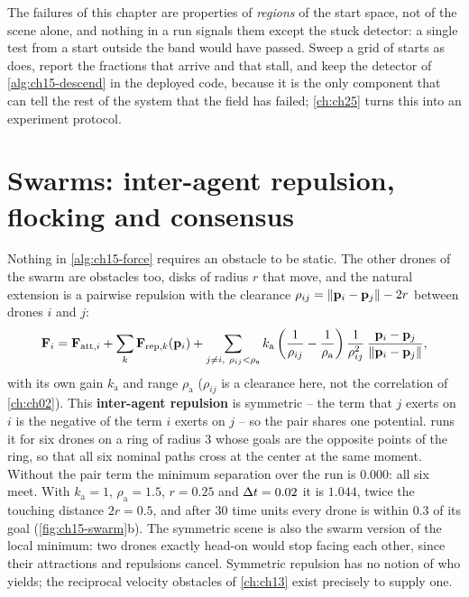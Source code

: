 The failures of this chapter are properties of \emph{regions} of the start
space, not of the scene alone, and nothing in a run signals them except the
stuck detector: a single test from a start outside the band would have
passed. Sweep a grid of starts as  does, report the
fractions that arrive and that stall, and keep the detector of
\cref{alg:ch15-descend} in the deployed code, because it is the only component
that can tell the rest of the system that the field has failed;
\cref{ch:ch25} turns this into an experiment protocol.

\section{Swarms: inter-agent repulsion, flocking and consensus}
\label{sec:ch15-swarm}

Nothing in \cref{alg:ch15-force} requires an obstacle to be static. The
other drones of the swarm are obstacles too, disks of radius $r$ that move,
and the natural extension is a pairwise repulsion with the clearance
$\rho_{ij} = \left\lVert \mathbf{p}_i - \mathbf{p}_j \right\rVert - 2r$ between drones $i$ and $j$:
\begin{equation}
  \mathbf{F}_i = \mathbf{F}_{\mathrm{att},i} + \sum_{k} \mathbf{F}_{\mathrm{rep},k}(\mathbf{p}_i)
  + \sum_{j \ne i,\ \rho_{ij} < \rho_{\mathrm{a}}}
    k_{\mathrm{a}} \left( \frac{1}{\rho_{ij}} - \frac{1}{\rho_{\mathrm{a}}} \right)
    \frac{1}{\rho_{ij}^2}\, \frac{\mathbf{p}_i - \mathbf{p}_j}{\left\lVert \mathbf{p}_i - \mathbf{p}_j \right\rVert},
  \label{eq:ch15-interagent}
\end{equation}
with its own gain $k_{\mathrm{a}}$ and range $\rho_{\mathrm{a}}$ ($\rho_{ij}$
is a clearance here, not the correlation of \cref{ch:ch02}).
This \textbf{inter-agent repulsion} is
symmetric -- the term that $j$ exerts on $i$ is the negative of the term $i$
exerts on $j$ -- so the pair shares one potential. 
runs it for six drones on a ring of radius $3$ whose goals are the opposite
points of the ring, so that all six nominal paths cross at the center at the
same moment. Without the pair term the minimum separation over the run is
$0.000$: all six meet. With $k_{\mathrm{a}} = 1$, $\rho_{\mathrm{a}} = 1.5$,
$r = 0.25$ and $\Delta t = 0.02$ it is $1.044$, twice the touching distance $2r = 0.5$, and
after $30$ time units every drone is within $0.3$ of its goal
(\cref{fig:ch15-swarm}b). The symmetric scene is also the swarm
version of the local minimum: two drones exactly head-on would stop facing
each other, since their attractions and repulsions cancel. Symmetric
repulsion has no notion of who yields; the reciprocal velocity obstacles of
\cref{ch:ch13} exist precisely to supply one.

